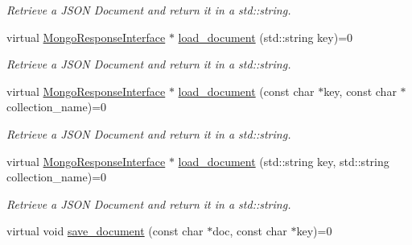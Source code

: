 \begin{DoxyCompactItemize}
\begin{DoxyCompactList}\small\item\em Retrieve a J\+S\+ON Document and return it in a std\+::string. \end{DoxyCompactList}\item 
virtual \hyperlink{classMongoResponseInterface}{Mongo\+Response\+Interface} $\ast$ \hyperlink{classMongoInterface_a19e569ead19f32799fa49805a6345551}{load\+\_\+document} (std\+::string key)=0\hypertarget{classMongoInterface_a19e569ead19f32799fa49805a6345551}{}\label{classMongoInterface_a19e569ead19f32799fa49805a6345551}

\begin{DoxyCompactList}\small\item\em Retrieve a J\+S\+ON Document and return it in a std\+::string. \end{DoxyCompactList}\item 
virtual \hyperlink{classMongoResponseInterface}{Mongo\+Response\+Interface} $\ast$ \hyperlink{classMongoInterface_abb8bf5ca5eed49b76fd91adcf3a8dfc8}{load\+\_\+document} (const char $\ast$key, const char $\ast$collection\+\_\+name)=0\hypertarget{classMongoInterface_abb8bf5ca5eed49b76fd91adcf3a8dfc8}{}\label{classMongoInterface_abb8bf5ca5eed49b76fd91adcf3a8dfc8}

\begin{DoxyCompactList}\small\item\em Retrieve a J\+S\+ON Document and return it in a std\+::string. \end{DoxyCompactList}\item 
virtual \hyperlink{classMongoResponseInterface}{Mongo\+Response\+Interface} $\ast$ \hyperlink{classMongoInterface_a7635ac63b0968306687632d037df5d4a}{load\+\_\+document} (std\+::string key, std\+::string collection\+\_\+name)=0\hypertarget{classMongoInterface_a7635ac63b0968306687632d037df5d4a}{}\label{classMongoInterface_a7635ac63b0968306687632d037df5d4a}

\begin{DoxyCompactList}\small\item\em Retrieve a J\+S\+ON Document and return it in a std\+::string. \end{DoxyCompactList}\item 
virtual void \hyperlink{classMongoInterface_a05885b7361096a03b623da8c7b48e461}{save\+\_\+document} (const char $\ast$doc, const char $\ast$key)=0\hypertarget{classMongoInterface_a05885b7361096a03b623da8c7b48e461}{}\label{classMongoInterface_a05885b7361096a03b623da8c7b48e461}


\end{DoxyCompactItemize}
